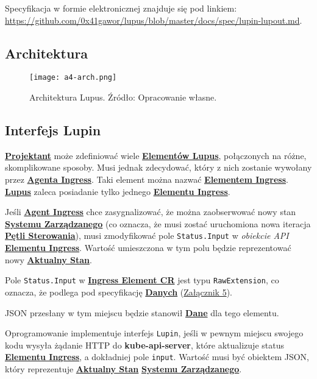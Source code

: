 \label{appendix:4}

Specyfikacja w formie elektronicznej znajduje się pod linkiem: \url{https://github.com/0x41gawor/lupus/blob/master/docs/spec/lupin-lupout.md}.

\subsection{Architektura}

\begin{figure}[!h]
    \centering \texttt{[image: a4-arch.png]}
    \caption{Architektura Lupus. Źródło: Opracowanie własne.}\label{fig:a4-arch}
\end{figure}

\subsection{Interfejs Lupin}

\hyperlink{def:projektant}{\textbf{Projektant}} może zdefiniować wiele \hyperlink{def:element-lupus}{\textbf{Elementów Lupus}}, połączonych na różne, skomplikowane sposoby. Musi jednak zdecydować, który z nich zostanie wywołany przez \hyperlink{def:agent-ingress}{\textbf{Agenta Ingress}}. Taki element można nazwać \hyperlink{def:element-ingres}{\textbf{Elementem Ingress}}. \hyperlink{def:lupus}{\textbf{Lupus}} zaleca posiadanie tylko jednego \hyperlink{def:element-ingres}{\textbf{Elementu Ingress}}.

Jeśli \hyperlink{def:agent-ingress}{\textbf{Agent Ingress}} chce zasygnalizować, że można zaobserwować nowy stan \hyperlink{def:system-zarzadzany}{\textbf{Systemu Zarządzanego}} (co oznacza, że musi zostać uruchomiona nowa iteracja \hyperlink{def:zamknieta-petla-sterowania}{\textbf{Pętli Sterowania}}), musi zmodyfikować pole \texttt{Status.Input} w \textit{obiekcie API} \hyperlink{def:element-ingres}{\textbf{Elementu Ingress}}. Wartość umieszczona w tym polu będzie reprezentować nowy \hyperlink{def:stan-aktualny}{\textbf{Aktualny Stan}}.

Pole \texttt{Status.Input} w \hyperlink{def:element-ingres}{\textbf{Ingress Element CR}} jest typu \texttt{RawExtension}, co oznacza, że podlega pod specyfikację \hyperlink{def:dane}{\textbf{Danych}} (\hyperref[appendix:5]{Załącznik 5}).

JSON przesłany w tym miejscu będzie stanowił \hyperlink{def:dane}{\textbf{Dane}} dla tego elementu.

Oprogramowanie implementuje interfejs \texttt{Lupin}, jeśli w pewnym miejscu swojego kodu wysyła żądanie HTTP do \textbf{kube-api-server}, które aktualizuje status \hyperlink{def:element-ingres}{\textbf{Elementu Ingress}}, a dokładniej pole \texttt{input}. Wartość musi być obiektem JSON, który reprezentuje \hyperlink{def:stan-aktualny}{\textbf{Aktualny Stan}} \hyperlink{def:system-zarzadzany}{\textbf{Systemu Zarządzanego}}. 


